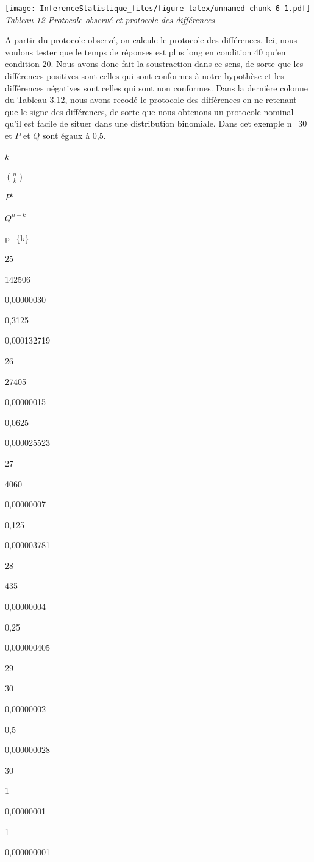 \documentclass[]{book}
\theoremstyle{definition}
\theoremstyle{definition}
\theoremstyle{definition}
\theoremstyle{remark}
\begin{document}
\texttt{[image: InferenceStatistique\_files/figure-latex/unnamed-chunk-6-1.pdf]}
\emph{Tableau 12 Protocole observé et protocole des différences}

A partir du protocole observé, on calcule le protocole des différences.
Ici, nous voulons tester que le temps de réponses est plus long en
condition 40 qu'en condition 20. Nous avons donc fait la soustraction
dans ce sens, de sorte que les différences positives sont celles qui
sont conformes à notre hypothèse et les différences négatives sont
celles qui sont non conformes. Dans la dernière colonne du Tableau 3.12,
nous avons recodé le protocole des différences en ne retenant que le
signe des différences, de sorte que nous obtenons un protocole nominal
qu'il est facile de situer dans une distribution binomiale. Dans cet
exemple n=30 et \(P\) et \(Q\) sont égaux à 0,5.

\(k\)

\(\binom{n}{k}\)

\(P^{k}\)

\(Q^{n-k}\)

p\_\{k\}

25

142506

0,00000030

0,3125

0,000132719

26

27405

0,00000015

0,0625

0,000025523

27

4060

0,00000007

0,125

0,000003781

28

435

0,00000004

0,25

0,000000405

29

30

0,00000002

0,5

0,000000028

30

1

0,00000001

1

0,000000001
\end{document}
